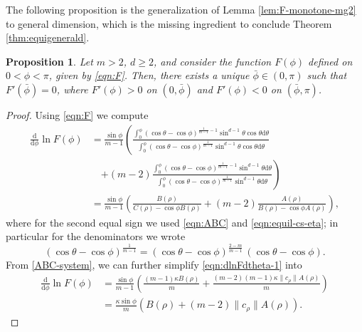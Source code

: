 \documentclass[11pt]{amsart}
\newtheorem{proposition}{Proposition}[section]
\def\d{\mathrm{d}}
\newcommand{\dm}{d} %
\begin{document}
The following proposition is the generalization of Lemma \ref{lem:F-monotone-mg2} to general dimension, which is the missing ingredient to conclude Theorem \ref{thm:equigenerald}.

\begin{proposition}
\label{prop:sgnFp}
Let $m>2$, $\dm \geq 2$, and consider the function $F(\phi)$ defined on $0<\phi<\pi$, given by \eqref{eqn:F}. Then, there exists a unique $\bar{\phi} \in (0,\pi)$ such that $F'(\bar{\phi})=0$, where $F'(\phi)>0$ on $(0,\bar{\phi})$ and $F'(\phi)<0$ on $(\bar{\phi},\pi)$.
\end{proposition}
\begin{proof}
Using \eqref{eqn:F} we compute
\begin{equation}
\label{eqn:dlnFdtheta-1}
\begin{aligned}
\frac{\d}{\d\phi}\ln F(\phi)&=\frac{\sin\phi}{m-1}\left(\frac{\int_0^\phi (\cos\theta-\cos\phi)^{\frac{1}{m-1}-1}\sin^{\dm-1}\theta \cos\theta\d\theta}{\int_0^\phi (\cos\theta-\cos\phi)^{\frac{1}{m-1}}\sin^{\dm-1}\theta \cos\theta\d\theta} \right. \\
&\quad \left. +(m-2)\frac{\int_0^\phi (\cos\theta-\cos\phi)^{\frac{1}{m-1}-1}\sin^{\dm-1}\theta \d\theta}{\int_0^\phi (\cos\theta-\cos\phi)^{\frac{1}{m-1}}\sin^{\dm-1}\theta \d\theta}
\right)\\
&=\frac{\sin\phi}{m-1}\left(
\frac{B(\rho)}{C(\rho)-\cos\phi B(\rho)}+(m-2)\frac{A(\rho)}{B(\rho)-\cos\phi A(\rho)}
\right),
 \end{aligned}
 \end{equation}
where for the second equal sign we used \eqref{eqn:ABC} and \eqref{eqn:equil-cs-eta}; in particular for the denominators we wrote
\[
(\cos\theta-\cos\phi)^{\frac{1}{m-1}} = (\cos\theta-\cos\phi)^{\frac{2-m}{m-1}} \, (\cos\theta-\cos\phi).
\]
From \eqref{ABC-system}, we can further simplify \eqref{eqn:dlnFdtheta-1} into
\begin{align*}
\frac{\d}{\d\phi}\ln F(\phi)&=\frac{\sin\phi}{m-1}\left(
\frac{(m-1)\kappa B(\rho)}{m}+\frac{(m-2)(m-1)\kappa \|c_\rho\|A(\rho)}{m}
\right)\\
&=\frac{\kappa \sin\phi}{m}\left(B(\rho)+(m-2)\|c_\rho\|A(\rho)\right).
\end{align*}


\end{proof}
\end{document}
